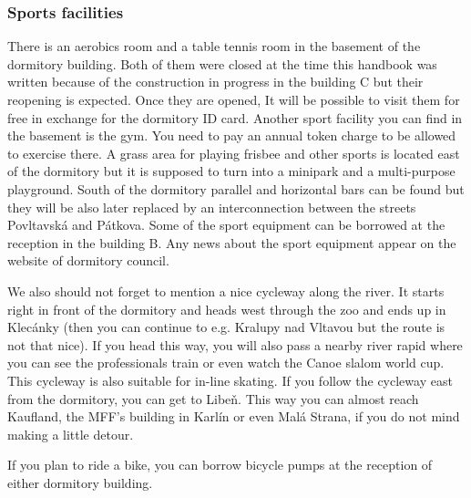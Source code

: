 \subsubsection{Sports facilities}
There is an aerobics room and a table tennis room in the basement of the
dormitory building. Both of them were closed at the time this handbook was
written because of the construction in progress in the building C but their
reopening is expected.
Once they are opened, It will be possible to visit them for free in exchange for
the dormitory ID card.
Another sport facility you can find in the basement is the gym. You need to pay
an annual token charge to be allowed to exercise there.
A grass area for playing frisbee and other sports is located east of the
dormitory but it is supposed to turn into a minipark and a multi-purpose
playground.
South of the dormitory parallel and horizontal bars can be found but they will
be also later replaced by an interconnection between the streets Povltavská and
Pátkova.
Some of the sport equipment can be borrowed at the reception in the building B.
Any news about the sport equipment appear on the website of dormitory council.

We also should not forget to mention a nice cycleway along the river. It starts
right in front of the dormitory and heads west through the zoo and ends up in
Klecánky (then you can continue to e.g. Kralupy nad Vltavou but the route is not
that nice).
If you head this way, you will also pass a nearby river rapid where you can see
the professionals train or even watch the Canoe slalom world cup.
This cycleway is also suitable for in-line skating.
If you follow the cycleway east from the dormitory, you can get to Libeň. This
way you can almost reach Kaufland, the MFF's building in Karlín or even Malá
Strana, if you do not mind making a little detour.

If you plan to ride a bike, you can borrow bicycle pumps at the reception of
either dormitory building.

